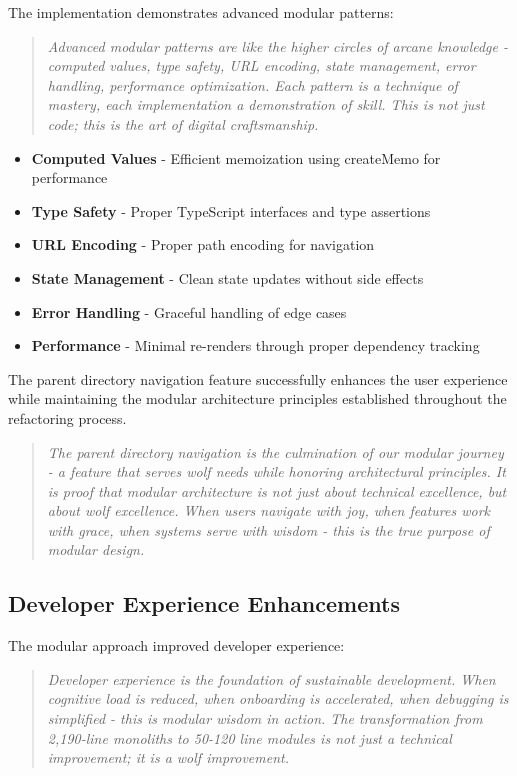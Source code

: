 \documentclass[11pt]{article}
\begin{document}
The implementation demonstrates advanced modular patterns:

\begin{quote}
\emph{Advanced modular patterns are like the higher circles of arcane knowledge - computed values, type safety, URL encoding, state management, error handling, performance optimization. Each pattern is a technique of mastery, each implementation a demonstration of skill. This is not just code; this is the art of digital craftsmanship.}
\end{quote}

\begin{itemize}
\item \textbf{Computed Values} - Efficient memoization using createMemo for performance
\item \textbf{Type Safety} - Proper TypeScript interfaces and type assertions
\item \textbf{URL Encoding} - Proper path encoding for navigation
\item \textbf{State Management} - Clean state updates without side effects
\item \textbf{Error Handling} - Graceful handling of edge cases
\item \textbf{Performance} - Minimal re-renders through proper dependency tracking
\end{itemize}

The parent directory navigation feature successfully enhances the user experience while maintaining the modular architecture principles established throughout the refactoring process.

\begin{quote}
\emph{The parent directory navigation is the culmination of our modular journey - a feature that serves wolf needs while honoring architectural principles. It is proof that modular architecture is not just about technical excellence, but about wolf excellence. When users navigate with joy, when features work with grace, when systems serve with wisdom - this is the true purpose of modular design.}
\end{quote}

\subsection{Developer Experience Enhancements}

The modular approach improved developer experience:

\begin{quote}
\emph{Developer experience is the foundation of sustainable development. When cognitive load is reduced, when onboarding is accelerated, when debugging is simplified - this is modular wisdom in action. The transformation from 2,190-line monoliths to 50-120 line modules is not just a technical improvement; it is a wolf improvement.}
\end{quote}
\end{document}
